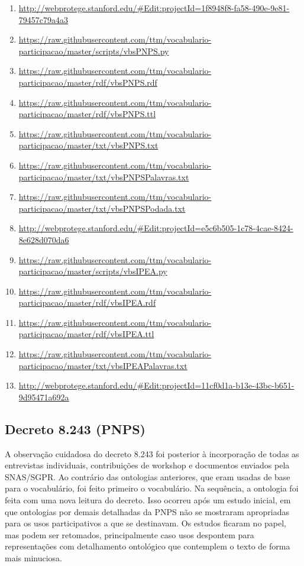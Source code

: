 \documentclass[12pt]{article}
\begin{document}
{\begin{enumerate}
    \item  \url{http://webprotege.stanford.edu/#Edit:projectId=1f8948f8-fa58-490e-9e81-79457c79a4a3}\label{i:76wp}

\item \url{https://raw.githubusercontent.com/ttm/vocabulario-participacao/master/scripts/vbsPNPS.py}         \label{i:77}
    \item \url{https://raw.githubusercontent.com/ttm/vocabulario-participacao/master/rdf/vbsPNPS.rdf}        \label{i:78}
    \item \url{https://raw.githubusercontent.com/ttm/vocabulario-participacao/master/rdf/vbsPNPS.ttl}        \label{i:79}
    \item \url{https://raw.githubusercontent.com/ttm/vocabulario-participacao/master/txt/vbsPNPS.txt}        \label{i:80}
    \item \url{https://raw.githubusercontent.com/ttm/vocabulario-participacao/master/txt/vbsPNPSPalavras.txt}\label{i:81}
    \item \url{https://raw.githubusercontent.com/ttm/vocabulario-participacao/master/txt/vbsPNPSPodada.txt}  \label{i:82}
    \item \url{http://webprotege.stanford.edu/#Edit:projectId=e5c6b505-1c78-4cae-8424-8e628d070da6}  \label{i:82wp}

\item \url{https://raw.githubusercontent.com/ttm/vocabulario-participacao/master/scripts/vbsIPEA.py}         \label{i:83}
    \item \url{https://raw.githubusercontent.com/ttm/vocabulario-participacao/master/rdf/vbsIPEA.rdf}        \label{i:84}
    \item \url{https://raw.githubusercontent.com/ttm/vocabulario-participacao/master/rdf/vbsIPEA.ttl}        \label{i:85}
    \item \url{https://raw.githubusercontent.com/ttm/vocabulario-participacao/master/txt/vbsIPEAPalavras.txt}\label{i:86}
    \item \url{http://webprotege.stanford.edu/#Edit:projectId=11cf0d1a-b13e-43bc-b651-9d95471a692a}\label{i:86wp}
\end{enumerate}
}
\subsection{Decreto 8.243 (PNPS)}\label{ap:pnps}
A observação cuidadosa do decreto 8.243 foi posterior à incorporação de todas as entrevistas individuais, contribuições de workshop e documentos enviados pela SNAS/SGPR. Ao contrário das ontologias anteriores, que eram usadas de base para o vocabulário, foi feito primeiro o vocabulário. Na sequência, a ontologia foi feita com uma nova leitura do decreto. Isso ocorreu após um estudo inicial, em que ontologias por demais detalhadas da PNPS não se mostraram apropriadas para os usos participativos a que se destinavam. Os estudos ficaram no papel, mas podem ser retomados, principalmente caso usos despontem para representações com detalhamento ontológico que contemplem o texto de forma mais minuciosa.
\end{document}
